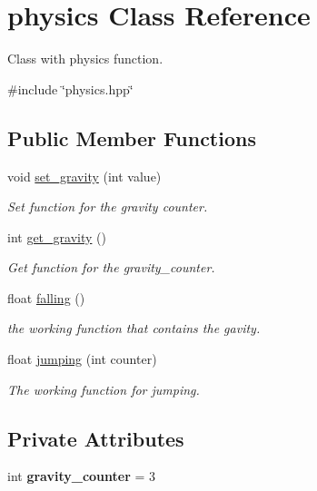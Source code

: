 \hypertarget{classphysics}{}\section{physics Class Reference}
\label{classphysics}


Class with physics function.  




{\ttfamily \#include \char`\"{}physics.\+hpp\char`\"{}}

\subsection*{Public Member Functions}
\begin{DoxyCompactItemize}
\item 
void \hyperlink{classphysics_a8b0dff646c304dee3cb5c095d821dc87}{set\+\_\+gravity} (int value)
\begin{DoxyCompactList}\small\item\em Set function for the gravity counter. \end{DoxyCompactList}\item 
int \hyperlink{classphysics_a3c4c6084fe0652b0bfd35afa5daa1c1e}{get\+\_\+gravity} ()
\begin{DoxyCompactList}\small\item\em Get function for the gravity\+\_\+counter. \end{DoxyCompactList}\item 
float \hyperlink{classphysics_acca1ee2fb8b760b6e4ee61ae7c2ee3da}{falling} ()
\begin{DoxyCompactList}\small\item\em the working function that contains the gavity. \end{DoxyCompactList}\item 
float \hyperlink{classphysics_aaf1c57aa6e35b9c83ccbfdfa8c18468c}{jumping} (int counter)
\begin{DoxyCompactList}\small\item\em The working function for jumping. \end{DoxyCompactList}\end{DoxyCompactItemize}
\subsection*{Private Attributes}
\begin{DoxyCompactItemize}
\item 
\mbox{\label{classphysics_a49345e47dcf7f97b9e1c20ba622cf5e4}} 
int {\bfseries gravity\+\_\+counter} = 3
\end{DoxyCompactItemize}


